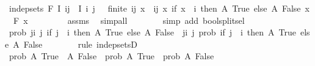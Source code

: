 \begin{isabellebody}
\ {\isachardoublequoteopen}indep{\isacharunderscore}{\kern0pt}sets\ F\ I{\isachardoublequoteclose}\ {\isachardoublequoteopen}{\isacharbraceleft}{\kern0pt}i{\isacharcomma}{\kern0pt}j{\isacharbraceright}{\kern0pt}\ {\isasymsubseteq}\ I{\isachardoublequoteclose}\ {\isachardoublequoteopen}{\isacharbraceleft}{\kern0pt}i{\isacharcomma}{\kern0pt}\ j{\isacharbraceright}{\kern0pt}\ {\isasymnoteq}\ {\isacharbraceleft}{\kern0pt}{\isacharbraceright}{\kern0pt}{\isachardoublequoteclose}\ {\isachardoublequoteopen}finite\ {\isacharbraceleft}{\kern0pt}i{\isacharcomma}{\kern0pt}j{\isacharbraceright}{\kern0pt}{\isachardoublequoteclose}\ {\isachardoublequoteopen}{\isasymforall}x\ {\isasymin}\ {\isacharbraceleft}{\kern0pt}i{\isacharcomma}{\kern0pt}j{\isacharbraceright}{\kern0pt}{\isachardot}{\kern0pt}\ {\isacharparenleft}{\kern0pt}{\isasymlambda}x{\isachardot}{\kern0pt}\ if\ x\ {\isacharequal}{\kern0pt}\ i\ then\ A\ True\ else\ A\ False{\isacharparenright}{\kern0pt}\ x\ {\isasymin}\ F\ x{\isachardoublequoteclose}\isanewline
\ \ \ \ \ \ \isamarkupfalse%
\ {\isacharasterisk}{\kern0pt}\ assms\ \isamarkupfalse%
\ simp{\isacharunderscore}{\kern0pt}all\isanewline
\ \ \ \ \ \ \isamarkupfalse%
\ {\isacharparenleft}{\kern0pt}simp\ add{\isacharcolon}{\kern0pt}\ bool{\isachardot}{\kern0pt}split{\isacharunderscore}{\kern0pt}sel{\isacharparenright}{\kern0pt}\isanewline
\ \ \ \ \isamarkupfalse%
\ \isamarkupfalse%
\ {\isachardoublequoteopen}prob\ {\isacharparenleft}{\kern0pt}{\isasymInter}j{\isasymin}{\isacharbraceleft}{\kern0pt}i{\isacharcomma}{\kern0pt}\ j{\isacharbraceright}{\kern0pt}{\isachardot}{\kern0pt}\ if\ j\ {\isacharequal}{\kern0pt}\ i\ then\ A\ True\ else\ A\ False{\isacharparenright}{\kern0pt}\ {\isacharequal}{\kern0pt}\ {\isacharparenleft}{\kern0pt}{\isasymProd}j{\isasymin}{\isacharbraceleft}{\kern0pt}i{\isacharcomma}{\kern0pt}\ j{\isacharbraceright}{\kern0pt}{\isachardot}{\kern0pt}\ prob\ {\isacharparenleft}{\kern0pt}if\ j\ {\isacharequal}{\kern0pt}\ i\ then\ A\ True\ else\ A\ False{\isacharparenright}{\kern0pt}{\isacharparenright}{\kern0pt}{\isachardoublequoteclose}\isanewline
\ \ \ \ \ \ \isamarkupfalse%
\ {\isacharparenleft}{\kern0pt}rule\ indep{\isacharunderscore}{\kern0pt}setsD{\isacharparenright}{\kern0pt}\isanewline
\ \ \ \ \isamarkupfalse%
\ \isamarkupfalse%
\ {\isachardoublequoteopen}prob\ {\isacharparenleft}{\kern0pt}A\ True\ {\isasyminter}\ A\ False{\isacharparenright}{\kern0pt}\ {\isacharequal}{\kern0pt}\ prob\ {\isacharparenleft}{\kern0pt}A\ True{\isacharparenright}{\kern0pt}\ {\isacharasterisk}{\kern0pt}\ prob\ {\isacharparenleft}{\kern0pt}A\ False{\isacharparenright}{\kern0pt}{\isachardoublequoteclose}\isanewline

\end{isabellebody}
